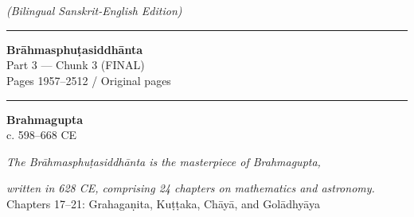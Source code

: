 \documentclass[10pt,a4paper]{article}
\newcommand{\shortline}{\noindent\rule{0.5\textwidth}{0.4pt}\par}
\begin{document}



\begin{titlepage}

\centering

\vspace*{2cm}



{\Huge\bfseries\color{titlecolor}}\\[0.6cm]

{\LARGE\bfseries\color{sectioncolor}}\\[0.4cm]

{\large\textit{(Bilingual Sanskrit-English Edition)}}\\[1.5cm]



\shortline



{\Large\textbf{Brāhmasphuṭasiddhānta}}\\[0.3cm]

{\large Part 3 — Chunk 3 (FINAL)}\\[0.3cm]

{\normalsize Pages 1957--2512 / Original pages }\\[1.5cm]



\shortline



{\Large\textbf{Brahmagupta}}\\[0.4cm]

{\large c. 598--668 CE}\\[1.5cm]



\vfill



{\small\textit{The Brāhmasphuṭasiddhānta is the masterpiece of Brahmagupta,}}

{\small\textit{written in 628 CE, comprising 24 chapters on mathematics and astronomy.}}\\[0.5cm]

{\small Chapters 17--21: Grahagaṇita, Kuṭṭaka, Chāyā, and Golādhyāya}



\end{titlepage}
\end{document}
